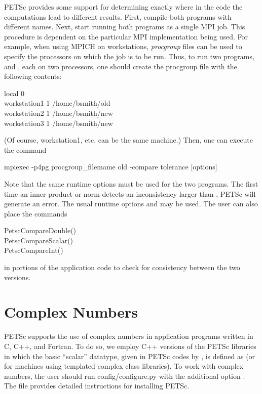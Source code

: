 {{{PETSc provides some support for determining exactly where in the code
the computations lead to different results. First, compile both programs
with different names.  Next, start running
both programs as a single MPI job. This procedure is dependent on the particular
MPI implementation being used.
For example, when using MPICH on workstations, 
{\em procgroup} files can be used to specify the processors on which the job is
to be run.  Thus, to run two programs,  and ,
each on two processors, one should create the procgroup file with the
following contents:
\begin{tabbing}
   local 0\\
   workstation1 1 /home/bsmith/old\\
   workstation2 1 /home/bsmith/new\\
   workstation3 1 /home/bsmith/new\\
\end{tabbing}
(Of course, workstation1, etc. can be the same machine.) Then, one can
execute the command
\begin{tabbing}
   mpiexec -p4pg \trl{<}procgroup\_filemame\trl{>} old -compare \trl{<}tolerance\trl{>} [options]
\end{tabbing}
Note that the same runtime options must be used for the two programs.
The first time an inner product or norm detects an inconsistency larger
than , PETSc will generate an error. The usual runtime
options  and  may 
be used.   The user can also place the commands 
\begin{tabbing}
   PetscCompareDouble()\\
   PetscCompareScalar()\\
   PetscCompareInt()
\end{tabbing}
  
in portions of the application code to check for consistency between
the two versions.
 
\section{Complex Numbers}  \label{sec_complex}

PETSc supports the use of complex numbers in application programs
written in C, C++, and Fortran.  To do so, we employ C++ versions of
the PETSc libraries in which the basic ``scalar'' datatype, given in
PETSc codes by , is defined as  (or  for machines using templated complex class
libraries).  To work with complex numbers,
the user should run config/configure.py with the additional option .
The file 
provides detailed instructions for installing PETSc.


}}}
